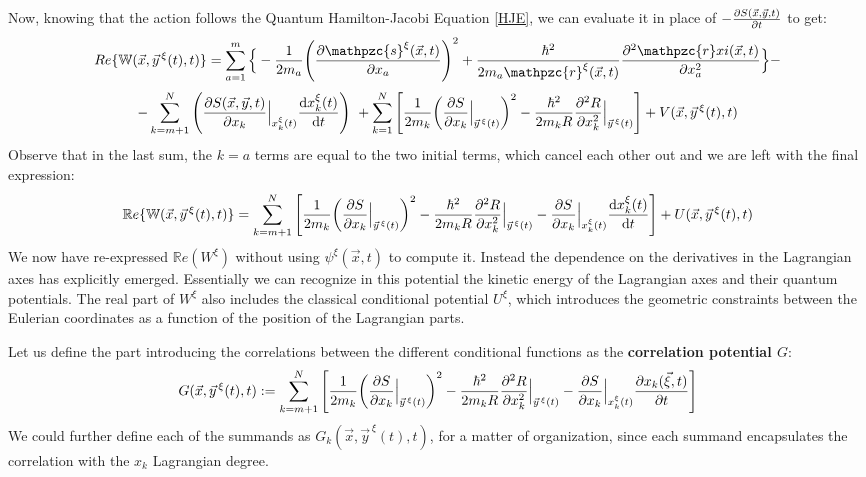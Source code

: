 \documentclass[11pt, a4paper]{article} %
\newcommand{\R}{\mathbb{R}} %
\newcommand{\z}{\mathpzc{s}}
\newcommand{\p}{\mathpzc{r}}
\newcommand{\W}{\mathbb{W}}
\begin{document}
Now, knowing that the action follows the Quantum Hamilton-Jacobi Equation \eqref{HJE}, we can evaluate it in place of $-\pdv{S(\vec{x},\vec{y},t)}{t}$ to get:
\newpage
\begin{equation}
Re\{\W(\vec{x}, \vec{y}^{\, \xi}(t),t)\}=\sum_{a=1}^m\Big\{-\frac{1}{2m_a} \qty(\pdv{\z^\xi(\vec{x},t)}{x_a})^2 +\frac{\hbar^2}{2m_a\p^\xi(\vec{x},t)}\pdv[2]{\p xi(\vec{x}, t)}{x_a}\Big\}-
\end{equation}
$$
-\sum_{k=m+1}^N \qty( \pdv{S(\vec{x},\vec{y},t)}{x_k}\Big\rvert_{x_k^\xi(t)} \dv{x_k^\xi(t)}{t})\ + \sum_{k=1}^N \qty[\frac{1}{2m_k} \qty(\pdv{S}{x_k}\Big\rvert_{\vec{y}^{\, \xi}(t)})^2 -\frac{\hbar^2}{2m_kR}\pdv[2]{R}{x_k}\Big\rvert_{\vec{y}^{\, \xi}(t)} ] + V(\vec{x}, \vec{y}^{\, \xi}(t),t)
$$
Observe that in the last sum, the $k=a$ terms are equal to the two initial terms, which cancel each other out and we are left with the final expression:\vspace{-0.1cm}\label{ReW}
\begin{equation*}
\R e\{\W(\vec{x}, \vec{y}^{\, \xi}(t),t)\}= \sum_{k=m+1}^N \qty[\frac{1}{2m_k} \qty(\pdv{S}{x_k}\Big\rvert_{\vec{y}^{\, \xi}(t)})^2 -\frac{\hbar^2}{2m_kR}\pdv[2]{R}{x_k}\Big\rvert_{\vec{y}^{\, \xi}(t)} -\pdv{S}{x_k}\Big\rvert_{x_k^\xi(t)} \dv{x_k^\xi(t)}{t} ] + U(\vec{x}, \vec{y}^{\, \xi}(t),t)
\end{equation*}
We now have re-expressed $\R e(W^\xi)$ without using $\psi^\xi(\vec{x},t)$ to compute it. Instead the dependence on the derivatives in the Lagrangian axes has explicitly emerged. Essentially we can recognize in this potential the kinetic energy of the Lagrangian axes and their quantum potentials. The real part of $W^\xi$ also includes the classical conditional potential $U^\xi$, which introduces the geometric constraints between the Eulerian coordinates as a function of the position of the Lagrangian parts. 

Let us define the part introducing the correlations between the different conditional functions as the {\bf correlation potential $G$}:
\begin{equation}\label{G}
G(\vec{x}, \vec{y}^{\, \xi}(t),t):=  \sum_{k=m+1}^N \qty[\frac{1}{2m_k} \qty(\pdv{S}{x_k}\Big\rvert_{\vec{y}^{\, \xi}(t)})^2 -\frac{\hbar^2}{2m_kR}\pdv[2]{R}{x_k}\Big\rvert_{\vec{y}^{\, \xi}(t)} -\pdv{S}{x_k}\Big\rvert_{x_k^\xi(t)} \pdv{x_k(\vec{\xi},t)}{t} ]
\end{equation}
We could further define each of the summands as $G_k(\vec{x},\vec{y}^{\, \xi}(t),t)$, for a matter of organization, since each summand encapsulates the correlation with the $x_k$ Lagrangian degree.
\end{document}
